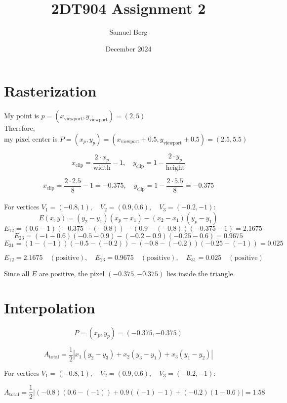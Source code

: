 \documentclass{article}
\title{2DT904 Assignment 2}
\author{Samuel Berg}
\date{December 2024}
\begin{document}
\maketitle

\tableofcontents


\newpage
\section{Rasterization}

My point is $p = (x_{\text{viewport}}, y_{\text{viewport}}) = (2,5)$ \\
Therefore, \\
\hspace*{10pt} my pixel center is $P = (x_p, y_p) = (x_{\text{viewport}} + 0.5, y_{\text{viewport}} + 0.5)= (2.5, 5.5)$ 

$$
x_{\text{clip}} = \frac{2 \cdot x_p}{\text{width}} - 1, \quad y_{\text{clip}} = 1 - \frac{2 \cdot y_p}{\text{height}}
$$

$$
x_{\text{clip}} = \frac{2 \cdot 2.5}{8} - 1= -0.375, \quad y_{\text{clip}} = 1 - \frac{2 \cdot 5.5}{8} = -0.375
$$
\\
For vertices $V_1 = (-0.8, 1), \quad V_2 = (0.9, 0.6), \quad V_3 = (-0.2, -1)$:
$$
E(x, y) = (y_2 - y_1)(x_p - x_1) - (x_2 - x_1)(y_p - y_1)
$$
$$
E_{12} = (0.6 - 1)(-0.375 - (-0.8)) - (0.9 - (-0.8))(-0.375 - 1) = 2.1675
$$
$$
E_{23} = (-1 - 0.6)(-0.5 - 0.9) - (-0.2 - 0.9)(-0.25 - 0.6) = 0.9675
$$
$$
E_{31} = (1 - (-1))(-0.5 - (-0.2)) - (-0.8 - (-0.2))(-0.25 - (-1)) = 0.025
$$

$$
E_{12} = 2.1675 \quad (\text{positive}), \quad E_{23} = 0.9675 \quad (\text{positive}), \quad E_{31} = 0.025 \quad (\text{positive})
$$

Since all $E$ are positive, the pixel $(-0.375, -0.375)$ lies inside the triangle.


\newpage
\section{Interpolation}

$$
P = (x_p, y_p) = (-0.375, -0.375)
$$

$$
A_{\text{total}} = \frac{1}{2} \left| x_1(y_2 - y_3) + x_2(y_3 - y_1) + x_3(y_1 - y_2) \right|
$$

For vertices $V_1 = (-0.8, 1), \quad V_2 = (0.9, 0.6), \quad V_3 = (-0.2, -1)$:

$$
A_{\text{total}} = \frac{1}{2} \left| (-0.8)(0.6 - (-1)) + 0.9((-1) - 1) + (-0.2)(1 - 0.6) \right| = 1.58
$$
\end{document}
